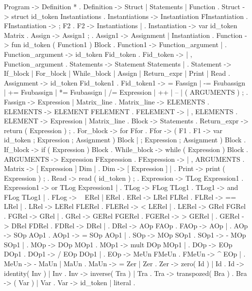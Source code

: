 Program ->   Definition * .
Definition ->    Struct |   Statements |   Function .
Struct ->    struct id_token { Instantiations } .
Instantiations -> Instantiation FInstantiation .
FInstantiation -> ; F2 .
F2 -> Instantiations | \epsilon.
Instantiation -> var id_token Matrix .
Assign ->    Assign1 ; .
Assign1 ->   Assignment |   Instantiation .
Function ->  fun id_token ( Function1 ) Block .
Function1 -> Function_argument |   \epsilon .
Function_argument -> id_token Fid_token .
Fid_token -> \epsilon |   , Function_argument .
Statements -> Statement Statements | \epsilon .
Statement -> If_block | For_block |   While_block |   Assign |   Return_expr |   Print |   Read .
Assignment ->    id_token Fid_token1 .
Fid_token1 ->    = Fassign |   -= Fsubassign |   += Fsubassign |   *= Fsubassign |   /= Expression |   ++ |   -- | ( ARGUMENTS ) ; .
Fassign ->   Expression |   Matrix_line .
Matrix_line ->   { ELEMENTS } .
ELEMENTS ->  ELEMENT FELEMENT .
FELEMENT ->  \epsilon |   , ELEMENTS .
ELEMENT ->   Expression |   Matrix_line .
Block -> { Statements } .
Return_expr ->   return ( Expression ) ; .
For_block -> for Ffor .
Ffor ->  ( F1 .
F1 ->    var id_token ; Expression ; Assignment ) Block |   \epsilon ; Expression ; Assignment ) Block .
If_block ->  if ( Expression ) Block .
While_block ->   while ( Expression ) Block .
ARGUMENTS -> Expression FExpression .
FExpression -> \epsilon |   , ARGUMENTS .
Matrix ->    [ Expression ] Dim | \epsilon.
Dim ->   [ Expression ] |   \epsilon .
Print -> print ( Expression ) ; .
Read ->  read ( id_token ) ; .
Expression ->    TLog Expression1 .
Expression1 ->   or TLog Expression1 | \epsilon    .
TLog ->  FLog TLog1 .
TLog1 -> and FLog TLog1 | \epsilon    .
FLog ->  ~ ERel |   ERel .
ERel ->  LRel FLRel .
FLRel -> == LRel | \epsilon    .
LRel ->  LERel FLERel .
FLERel ->    < LERel | \epsilon    .
LERel -> GRel FGRel .
FGRel -> \leq GRel | \epsilon    .
GRel ->  GERel FGERel .
FGERel ->    > GERel | \epsilon    .
GERel -> DRel FDRel .
FDRel -> \geq DRel | \epsilon    .
DRel ->  AOp FAOp .
FAOp ->  \neq AOp | \epsilon    .
AOp ->   SOp AOp1 .
AOp1 ->  = SOp AOp1 | \epsilon    .
SOp ->   MOp SOp1 .
SOp1 ->  - MOp SOp1 | \epsilon    .
MOp ->   DOp MOp1 .
MOp1 ->  mult DOp MOp1 | \epsilon    .
DOp ->   EOp DOp1 .
DOp1 ->  / EOp DOp1 | \epsilon    .
EOp ->   MeUn FMeUn .
FMeUn -> ^ EOp | \epsilon    .
MeUn ->  - MaUn |   MaUn .
MaUn ->  = Zer |   Zer .
Zer ->   zero( Id ) |   Id .
Id ->    identity( Inv ) |   Inv .
Inv ->   inverse( Tra ) |   Tra .
Tra ->   transpozed( Bra ) .
Bra ->   ( Var ) | Var .
Var ->   id_token | literal .